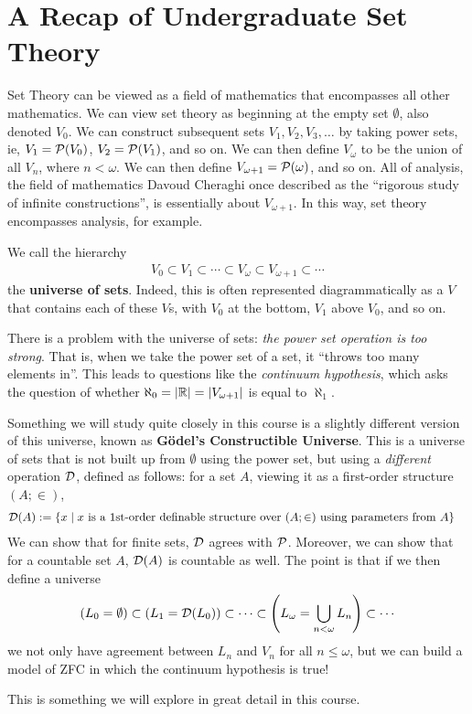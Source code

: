 
\chapter{A Recap of Undergraduate Set Theory} \label{Ch1:CH}
\thispagestyle{empty}

Set Theory can be viewed as a field of mathematics that encompasses all other mathematics. We can view set theory as beginning at the empty set $\emptyset$, also denoted $V_0$. We can construct subsequent sets $V_1, V_2, V_3, \ldots$ by taking power sets, ie, $V_1 = \mathcal{P}\!\left( V_0 \right)$, $V_2 = \mathcal{P}\!\left( V_1 \right)$, and so on. We can then define $V_{\omega}$ to be the union of all $V_n$, where $n < \omega$. We can then define $V_{\omega + 1} = \mathcal{P}\!\left( \omega \right)$, and so on. All of analysis, the field of mathematics Davoud Cheraghi once described as the ``rigorous study of infinite constructions'', is essentially about $V_{\omega + 1}$. In this way, set theory encompasses analysis, for example.

We call the hierarchy
\begin{align*}
    V_0 \subset V_1 \subset \cdots \subset V_{\omega} \subset V_{\omega + 1} \subset \cdots
\end{align*}
the \textbf{universe of sets}. Indeed, this is often represented diagrammatically as a $V$ that contains each of these $V$s, with $V_0$ at the bottom, $V_1$ above $V_0$, and so on.

There is a problem with the universe of sets: \textit{the power set operation is too strong}. That is, when we take the power set of a set, it ``throws too many elements in''. This leads to questions like the \textit{continuum hypothesis}, which asks the question of whether $\aleph_0 = \left\lvert \mathbb{R} \right\rvert = \left\lvert V_{\omega + 1} \right\rvert$ is equal to $\aleph_1$.

Something we will study quite closely in this course is a slightly different version of this universe, known as \textbf{Gödel's Constructible Universe}. This is a universe of sets that is not built up from $\emptyset$ using the power set, but using a \textit{different} operation $\mathcal{D}$, defined as follows: for a set $A$, viewing it as a first-order structure $(A; \in)$,
\begin{align*}
    \mathcal{D}(A) &:= \left\{ x \; \middle\vert \; x \text{ is a 1st-order definable structure over } (A; \in) \text{ using parameters from } A \right\}
\end{align*}
We can show that for finite sets, $\mathcal{D}$ agrees with $\mathcal{P}$. Moreover, we can show that for a countable set $A$, $\mathcal{D}(A)$ is countable as well. The point is that if we then define a universe
\begin{align*}
    \left( L_0 = \emptyset \right) \subset \left( L_1 = \mathcal{D}\!\left( L_0 \right) \right) \subset \cdots \subset \left( L_{\omega} = \bigcup_{n < \omega} L_n \right) \subset \cdots
\end{align*}
we not only have agreement between $L_n$ and $V_n$ for all $n \leq \omega$, but we can build a model of ZFC in which the continuum hypothesis is true!

This is something we will explore in great detail in this course.


